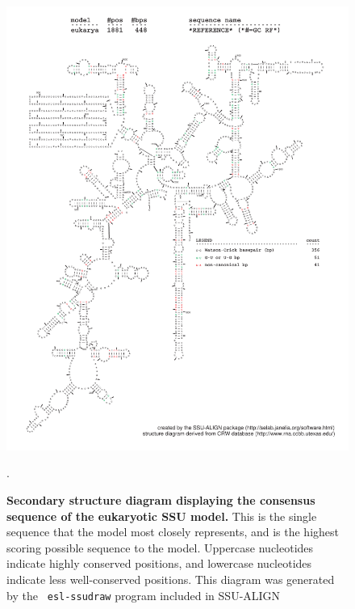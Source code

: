 \begin{figure}
\begin{center}
\includegraphics[width=5.7in]{Figures/eukarya-0p1-rf}
\end{center}
\caption[Secondary structure diagram displaying the consensus sequence
  of the eukaryotic SSU model]{\textbf{Secondary structure diagram displaying the
  consensus sequence of the eukaryotic SSU model.} 
  This is the single sequence that the model 
  most closely represents, and is the highest scoring possible
  sequence to the model. Uppercase nucleotides indicate highly conserved positions,
  and lowercase nucleotides indicate less well-conserved positions.
  This diagram was generated by the {\tt
  esl-ssudraw} program included in SSU-ALIGN}.
\label{fig:eukrf}
\end{figure}

